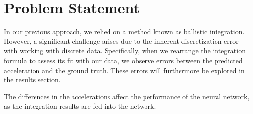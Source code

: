 \section{Problem Statement}
In our previous approach, we relied on a method known as ballistic integration. 
However, a significant challenge arises due to the inherent discretization error with working with discrete data.
Specifically, when we rearrange the integration formula to assess its fit with our data, 
we observe errors between the predicted acceleration and the ground truth.
These errors will furthermore be explored in the results section.

The differences in the accelerations affect the performance of the neural network, 
as the integration results are fed into the network.

